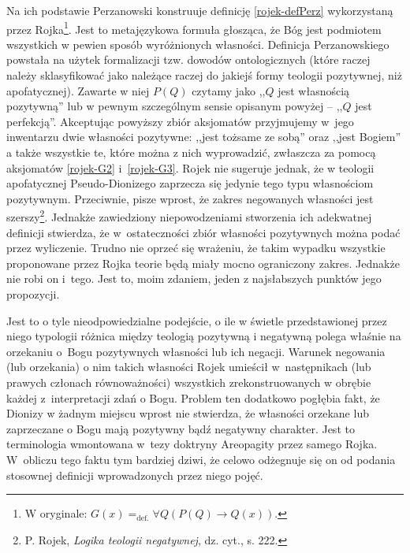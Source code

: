 Na ich podstawie Perzanowski konstruuje definicję \eqref{rojek-defPerz} wykorzystaną przez Rojka\footnote{W oryginale:
$G(x) =_{\text{def.}} \forall Q (P(Q) \to Q(x))$.
}. Jest to metajęzykowa formuła głosząca, że Bóg jest podmiotem
wszystkich w pewien sposób wyróżnionych własności. Definicja Perzanowskiego powstała na użytek
formalizacji tzw. dowodów ontologicznych (które raczej należy sklasyfikować jako należące raczej do jakiejś
formy teologii pozytywnej, niż apofatycznej). Zawarte w niej $P(Q)$ czytamy jako ,,$Q$ jest
własnością pozytywną'' lub w pewnym szczególnym sensie opisanym powyżej -- ,,$Q$
jest perfekcją''. Akceptując powyższy zbiór aksjomatów przyjmujemy w~jego inwentarzu dwie własności pozytywne:
,,jest tożsame ze sobą'' oraz ,,jest Bogiem'' a także wszystkie te, które można z nich 
wyprowadzić, zwłaszcza za pomocą aksjomatów \eqref{rojek-G2} i~\eqref{rojek-G3}.
Rojek nie sugeruje jednak, że w teologii apofatycznej
Pseudo-Dionizego zaprzecza się jedynie tego typu własnościom
pozytywnym. Przeciwnie, pisze wprost, że zakres negowanych własności
jest szerszy\footnote{P. Rojek, \textit{Logika teologii negatywnej}, dz. cyt., s. 222. }. 
Jednakże zawiedziony niepowodzeniami
stworzenia ich adekwatnej definicji stwierdza, że
w~ostateczności zbiór własności
pozytywnych można podać przez wyliczenie. Trudno nie oprzeć się wrażeniu, że takim wypadku
wszystkie proponowane przez Rojka teorie będą miały mocno ograniczony
zakres. Jednakże nie robi on i~tego.
Jest to, moim zdaniem, jeden z najsłabszych punktów
jego propozycji.










Jest
to o tyle  nieodpowiedzialne podejście, o ile w świetle przedstawionej przez niego typologii
różnica między teologią pozytywną i negatywną polega właśnie na orzekaniu o~Bogu pozytywnych własności lub ich negacji. Warunek negowania (lub orzekania) o nim takich własności Rojek umieścił w~następnikach (lub prawych członach równoważności) wszystkich zrekonstruowanych w obrębie każdej z~interpretacji zdań o Bogu.
Problem ten dodatkowo pogłębia fakt, że Dionizy w żadnym miejscu wprost
nie stwierdza, że własności orzekane lub zaprzeczane o Bogu mają
pozytywny bądź negatywny charakter. Jest to terminologia wmontowana w~tezy doktryny Areopagity przez samego Rojka.
W~obliczu tego faktu tym
bardziej dziwi, że celowo odżegnuje się on od podania stosownej
definicji wprowadzonych przez niego pojęć.


